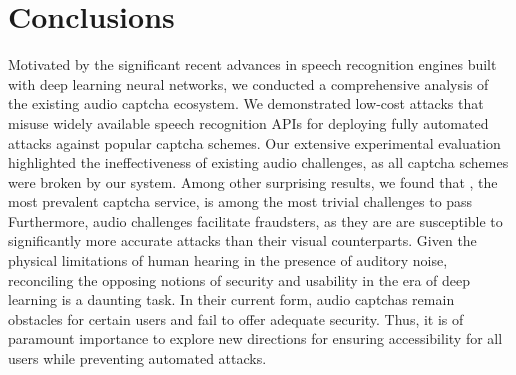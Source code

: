 \section{Conclusions}
\label{sec:conclusions}

Motivated by the significant recent advances in speech recognition engines 
built with deep learning neural networks, we conducted a comprehensive 
analysis of the existing audio captcha ecosystem. We demonstrated low-cost attacks that misuse
widely available speech recognition APIs for deploying fully automated attacks
against \no popular captcha schemes. Our extensive experimental evaluation
highlighted the ineffectiveness of existing audio challenges, as all captcha
schemes were broken by our \system system. Among other surprising results,
we found that \re, the most prevalent captcha service, is among the most 
trivial challenges to pass  Furthermore, \re audio challenges facilitate 
fraudsters, as they are are susceptible to significantly more accurate attacks
than their visual counterparts. Given the physical limitations of human hearing
in the presence of auditory noise, reconciling the opposing notions of security 
and usability in the era of deep learning is a daunting task. In their current form,
audio captchas remain obstacles for certain users and fail to offer adequate security.
Thus, it is of paramount importance to explore new directions for ensuring accessibility
for all users while preventing automated attacks.


